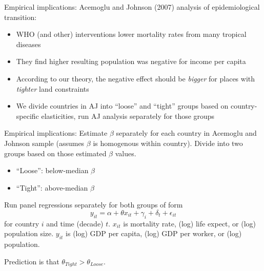 \documentclass[10pt, xcolor=dvipsnames]{beamer}
\begin{document}
\begin{frame}{Empirical implications:}
Acemoglu and Johnson (2007) analysis of epidemiological transition:
\begin{itemize}
  \item WHO (and other) interventions lower mortality rates from many tropical diseases
  \item They find higher resulting population was negative for income per capita
  \item According to our theory, the negative effect should be \textit{bigger} for places with \textit{tighter} land constraints
  \item We divide countries in AJ into ``loose'' and ``tight'' groups based on country-specific elasticities, run AJ analysis separately for those groups
\end{itemize}



\end{frame}

\begin{frame}{Empirical implications:}
Estimate $\beta$ separately for each country in Acemoglu and Johnson sample (assumes $\beta$ is homogenous within country). Divide into two groups based on those estimated $\beta$ values.
\begin{itemize}
  \item ``Loose'': below-median $\beta$
  \item ``Tight'': above-median $\beta$
\end{itemize}

\vspace{.25in}\noindent Run panel regressions separately for both groups of form
\begin{equation}
    y_{it} = \alpha + \theta x_{it} + \gamma_i + \delta_t + \epsilon_{it}
\end{equation}
for country $i$ and time (decade) $t$. $x_{it}$ is mortality rate, (log) life expect, or (log) population size. $y_{it}$ is (log) GDP per capita, (log) GDP per worker, or (log) population.

\vspace{.25in}\noindent Prediction is that $\theta_{Tight} > \theta_{Loose}$.

\end{frame}
\end{document}
